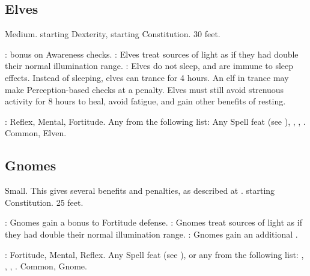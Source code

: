 \subsection{Elves}
 Medium.
  starting Dexterity,  starting Constitution.
 30 feet.
\begin{itemize}
    :  bonus on Awareness checks.
    : Elves treat sources of light as if they had double their normal illumination range.
    : Elves do not sleep, and are immune to sleep effects. Instead of sleeping, elves can trance for 4 hours. An elf in trance may make Perception-based checks at a  penalty. Elves must still avoid strenuous activity for 8 hours to heal, avoid fatigue, and gain other benefits of resting.
\end{itemize}
:  Reflex,  Mental,  Fortitude.
 Any from the following list: Any Spell feat (see ), , , .
 Common, Elven.

\subsection{Gnomes}
 Small. This gives several benefits and penalties, as described at .
  starting Constitution.
 25 feet.
\begin{itemize}
    : Gnomes gain a  bonus to Fortitude defense.
    : Gnomes treat sources of light as if they had double their normal illumination range.
    : Gnomes gain an additional .
\end{itemize}
:  Fortitude,  Mental,  Reflex.
 Any Spell feat (see ), or any from the following list: , , , .
 Common, Gnome.

